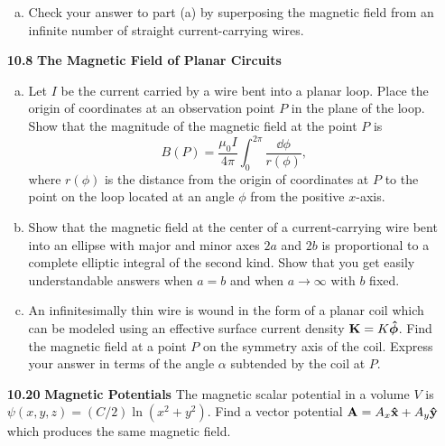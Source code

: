 \documentclass{article}
\begin{document}
\begin{enumerate}[align=parleft,labelsep=20pt]
\begin{enumerate}[(a), align=parleft,labelsep=20pt]
        \item Check your answer to part (a) by superposing the magnetic field from an infinite number of straight current-carrying wires.
    \end{enumerate}

    \item [\textbf{10.8 }] \textbf{The Magnetic Field of Planar Circuits }
    \begin{enumerate}[(a), align=parleft,labelsep=20pt]
        \item Let $I$ be the current carried by a wire bent into a planar loop. Place the origin of coordinates at an observation point $P$ in the plane of the loop. Show that the magnitude of the magnetic field at the point $P$ is
        \[
            B(P) = \frac{\mu_0 I}{4\pi}\int_0^{2\pi} \frac{\dd{\phi}}{r(\phi)},
        \]
        where $r(\phi)$ is the distance from the origin of coordinates at $P$ to the point on the loop located at an angle $\phi$ from the positive $x$-axis.

        \item Show that the magnetic field at the center of a current-carrying wire bent into an ellipse with major and minor axes $2a$ and $2b$ is proportional to a complete elliptic integral of the second kind. Show that you get easily understandable answers when $a=b$ and when $a\to\infty$ with $b$ fixed.

        \item An infinitesimally thin wire is wound in the form of a planar coil which can be modeled using an effective surface current density $\textstyle\vb{K} = K\vu*{\phi}$. Find the magnetic field at a point $P$ on the symmetry axis of the coil. Express your answer in terms of the angle $\alpha$ subtended by the coil at $P$.
    \end{enumerate}

    \item [\textbf{10.20 }] \textbf{Magnetic Potentials } The magnetic scalar potential in a volume $V$ is $\psi(x,y,z) = (C/2)\ln(x^2+y^2)$. Find a vector potential $\vb{A} = A_x\vu{x} + A_y\vu{y}$ which produces the same magnetic field.


\end{enumerate}
\end{document}
